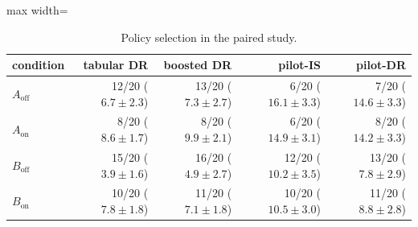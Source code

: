 \begin{table}[!htbp]
\centering
\caption{Policy selection in the paired study.}
\label{tab:campaignselection}
\small
\begin{adjustbox}{max width=\linewidth}
\begin{tabular}{lrrrr}
\toprule
condition & tabular DR & boosted DR & pilot-IS & pilot-DR \\
\midrule
$A_{\mathrm{off}}$ & 12/20 ($6.7 \pm 2.3$) & 13/20 ($7.3 \pm 2.7$) & 6/20 ($16.1 \pm 3.3$) & 7/20 ($14.6 \pm 3.3$) \\
$A_{\mathrm{on}}$ & 8/20 ($8.6 \pm 1.7$) & 8/20 ($9.9 \pm 2.1$) & 6/20 ($14.9 \pm 3.1$) & 8/20 ($14.2 \pm 3.3$) \\
$B_{\mathrm{off}}$ & 15/20 ($3.9 \pm 1.6$) & 16/20 ($4.9 \pm 2.7$) & 12/20 ($10.2 \pm 3.5$) & 13/20 ($7.8 \pm 2.9$) \\
$B_{\mathrm{on}}$ & 10/20 ($7.8 \pm 1.8$) & 11/20 ($7.1 \pm 1.8$) & 10/20 ($10.5 \pm 3.0$) & 11/20 ($8.8 \pm 2.8$) \\
\bottomrule
\end{tabular}
\end{adjustbox}
\end{table}

